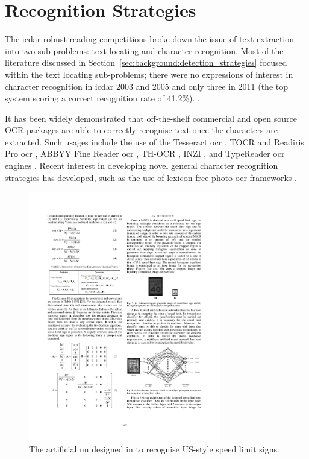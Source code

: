 \section{Recognition Strategies}
\label{sec:background:recognition_strategies}

The \gls{icdar} robust reading competitions \citep{Lucas:2003iw, Lucas:2005bq, Shahab:2011hq} broke down the issue of text extraction into two sub-problems: text locating and character recognition. Most of the literature discussed in Section~\ref{sec:background:detection_strategies} focused within the text locating sub-problems; there were no expressions of interest in character recognition in \gls{icdar} 2003 and 2005 and only three in 2011 (the top system \citep{Liu:2005uw} scoring a correct recognition rate of 41.2\%). .

It has been widely demonstrated that off-the-shelf commercial and open source OCR packages are able to correctly recognise text once the characters are extracted. Such usages include the use of the Tesseract \gls{ocr} \citep{Benami:2012jf} , TOCR and Readiris Pro \gls{ocr} \citep{XiangrongChen:2004ha}, ABBYY Fine Reader \gls{ocr} \citep{XiangrongChen:2004ha, Gatos:2005wd, Wang:2011tw, XiaomingHuang:2015fb}, TH-OCR , INZI , and TypeReader \gls{ocr} \citep{Li:2010dy} engines . Recent interest in developing novel general character recognition strategies has developed, such as the use of lexicon-free photo \gls{ocr} frameworks \citep{Lee:2016uy}.

\begin{figure}[h]
  \centering
  \includegraphics[width=0.75\textwidth]{images/background/kundu2015_nn}
  \caption[A NN designed to recognised speed limit signs]{The artificial  \gls{nn} designed in \citet{Kundu:2015vq} to recognise US-style speed limit signs.}
  \label{fig:background:recognition:kundu2015_nn}
\end{figure}

